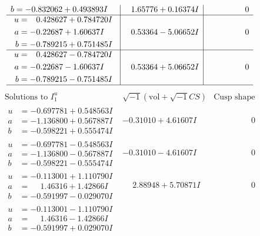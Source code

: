 \documentclass[1p]{elsarticle_modified}
\theoremstyle{definition}
\newcommand{\I}{\sqrt{-1}}
\begin{document}
$$\begin{array}{c|c|c}
\begin{aligned}
b &= -0.832062 + 0.493893 I\end{aligned}
 & \phantom{-}1.65776 + 0.16374 I & \phantom{-0.000000 } 0 \\ \hline\begin{aligned}
u &= \phantom{-}0.428627 + 0.784720 I \\
a &= -0.22687 + 1.60637 I \\
b &= -0.789215 + 0.751485 I\end{aligned}
 & \phantom{-}0.53364 - 5.06652 I & \phantom{-0.000000 } 0 \\ \hline\begin{aligned}
u &= \phantom{-}0.428627 - 0.784720 I \\
a &= -0.22687 - 1.60637 I \\
b &= -0.789215 - 0.751485 I\end{aligned}
 & \phantom{-}0.53364 + 5.06652 I & \phantom{-0.000000 } 0\\
 \hline 
 \end{array}$$\newpage$$\begin{array}{c|c|c}  
\text{Solutions to }I^u_{1}& \I (\text{vol} + \sqrt{-1}CS) & \text{Cusp shape}\\
 \hline 
\begin{aligned}
u &= -0.697781 + 0.548563 I \\
a &= -1.136800 + 0.567887 I \\
b &= -0.598221 + 0.555474 I\end{aligned}
 & -0.31010 + 4.61607 I & \phantom{-0.000000 } 0 \\ \hline\begin{aligned}
u &= -0.697781 - 0.548563 I \\
a &= -1.136800 - 0.567887 I \\
b &= -0.598221 - 0.555474 I\end{aligned}
 & -0.31010 - 4.61607 I & \phantom{-0.000000 } 0 \\ \hline\begin{aligned}
u &= -0.113001 + 1.110790 I \\
a &= \phantom{-}1.46316 + 1.42866 I \\
b &= -0.591997 - 0.029070 I\end{aligned}
 & \phantom{-}2.88948 + 5.70871 I & \phantom{-0.000000 } 0 \\ \hline\begin{aligned}
u &= -0.113001 - 1.110790 I \\
a &= \phantom{-}1.46316 - 1.42866 I \\
b &= -0.591997 + 0.029070 I\end{aligned}

\end{array}$$
\end{document}
